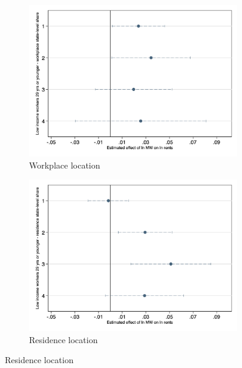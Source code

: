\begin{figure}[h!]
    \caption{Static DiD model: MW impact by workers job and residence location}
    \label{fig:static_dd_workers_home_work}
    \centering
    \begin{subfigure}[b]{0.6\textwidth}
        \caption{Workplace location}                  %
        \includegraphics[width = \textwidth]{input/fd_static_heter_walall_29y_lowinc_ssh.png}
    \end{subfigure}
    \begin{subfigure}[b]{0.6\textwidth}
        \caption{Residence location}
        \includegraphics[width = \textwidth]{input/fd_static_heter_halall_29y_lowinc_ssh.png}
    \end{subfigure}
    \begin{minipage}{0.95\textwidth} \footnotesize

\end{minipage}
\end{figure}
